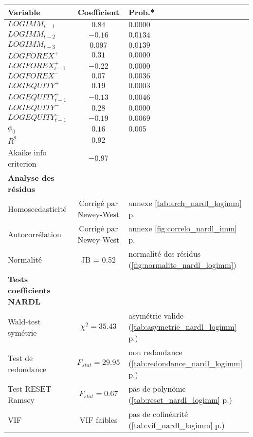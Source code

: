 \begin{tabular}{lcl}
\toprule
\textbf{Variable} & \textbf{Coefficient} & \textbf{Prob.*} \\ %
\midrule
$LOGIMM_{t-1}$ & $0.84$ & $0.0000$ \\
$LOGIMM_{t-2}$ & $-0.16$ & $0.0134$ \\
$LOGIMM_{t-3}$ & $0.097$ & $0.0139$ \\
$LOGFOREX^+$ & $0.31$ & $0.0000$ \\
$LOGFOREX^+_{t-1}$ & $-0.22$ & $0.0000$ \\
$LOGFOREX^-$ & $0.07$ & $0.0036$ \\
$LOGEQUITY^+$ & $0.19$ & $0.0003$ \\
$LOGEQUITY^+_{t-1}$ & $-0.13$ & $0.0046$ \\
$LOGEQUITY^-$ & $0.28$ & $0.0000$ \\
$LOGEQUITY^-_{t-1}$ & $-0.19$ & $0.0069$ \\
$\phi_0$ & $0.16$ & $0.005$ \\
\midrule %
\textbf{$R^2$} & $0.92$ & \\
Akaike info criterion & $-0.97$ & \\
\midrule %
\textbf{Analyse des résidus} \\ %
Homoscedasticité & Corrigé par Newey-West & annexe \ref{tab:arch_nardl_logimm} p.\pageref{tab:arch_nardl_logimm} \\
Autocorrélation & Corrigé par Newey-West & annexe \ref{fig:correlo_nardl_imm} p.\pageref{fig:correlo_nardl_imm} \\
Normalité & JB = 0.52 & normalité des résidus \footnotesize{(\ref{fig:normalite_nardl_logimm}}) \\
\midrule %
\textbf{Tests coefficients NARDL} \\ %
Wald-test symétrie & $\chi^2 = 35.43$ & asymétrie valide \footnotesize{(\ref{tab:asymetrie_nardl_logimm} p.\pageref{tab:asymetrie_nardl_logimm})}  \\
Test de redondance & $F_{stat} = 29.95$ & non redondance \footnotesize{(\ref{tab:redondance_nardl_logimm} p.\pageref{tab:redondance_nardl_logimm})} \\
Test RESET Ramsey & $F_{stat} = 0.67$ & pas de polynôme \footnotesize{(\ref{tab:reset_nardl_logimm} p.\pageref{tab:reset_nardl_logimm})}  \\
VIF & VIF faibles & pas de colinéarité \footnotesize{(\ref{tab:vif_nardl_logimm} p.\pageref{tab:vif_nardl_logimm})} \\
\bottomrule
\end{tabular}

